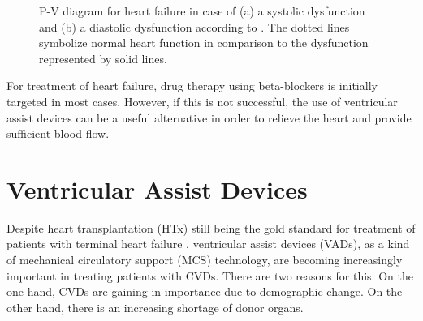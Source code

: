 \begin{figure}[ht]
  \centering
  \caption[P-V diagram for heart failure]{P-V diagram for heart failure in case of (a) a systolic dysfunction and (b) a diastolic dysfunction according to \cite{HKS_pv}. The dotted lines symbolize normal heart function in comparison to the dysfunction represented by solid lines.}
  \label{fig:hf_dys}
\end{figure}
For treatment of heart failure, drug therapy using beta-blockers is initially targeted in most cases. However, if this is not successful, the use of ventricular assist devices can be a useful alternative in order to relieve the heart and provide sufficient blood flow. \cite{HKS4}

\section{Ventricular Assist Devices}
Despite heart transplantation (HTx) still being the gold standard for treatment of patients with terminal heart failure \cite{VAD2}, ventricular assist devices (VADs), as a kind of mechanical circulatory support (MCS) technology, are becoming increasingly important in treating patients with CVDs. There are two reasons for this. On the one hand, CVDs are gaining in importance due to demographic change. On the other hand, there is an increasing shortage of donor organs. \cite{VAD7}

